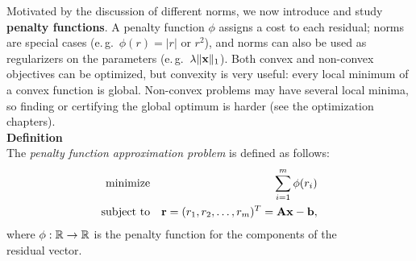   Motivated by the discussion of different norms, we now introduce and study \textbf{penalty functions}. A penalty function $\phi$ assigns a cost to each residual; norms are special cases (e.\,g.\ $\phi(r)=|r|$ or $r^2$), and norms can also be used as regularizers on the parameters (e.\,g.\ $\lambda\|\bm{\mathrm{x}}\|_1$). Both convex and non-convex objectives can be optimized, but convexity is very useful: every local minimum of a convex function is global. Non-convex problems may have several local minima, so finding or certifying the global optimum is harder (see the optimization chapters).\\[0.3cm]
  
  \textbf{Definition}\\
The \emph{penalty function approximation problem} is defined as follows:
    \begin{eqnarray*}
      \mbox{minimize}   & &\sum_{i=1}^m \phi(r_i) \\
      \mbox{subject to} & & \bm{\mathrm{r}}= (r_1, r_2, \dots, r_m)^T = \mathbf{A}\bm{\mathrm{x}} -\bm{\mathrm{b}},
    \end{eqnarray*}
    where $\phi:\mathbb{R} \rightarrow \mathbb{R}$ is the penalty function for the components of the \\
    residual vector.
    
